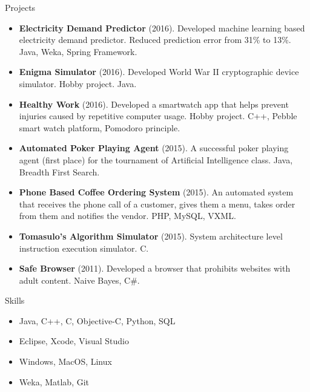 \documentclass[]{mcdowellcv}
\begin{document}
    \begin{cvsection}{Projects}
        \begin{cvsubsection}{}{}{}
            \begin{itemize}
            \item \textbf{Electricity Demand Predictor} (2016).  Developed machine learning based electricity demand predictor. Reduced prediction error from 31\% to 13\%. Java, Weka, Spring Framework.
            \item \textbf{Enigma Simulator} (2016).  Developed World War II cryptographic device simulator. Hobby project.  Java.
                \item \textbf{Healthy Work} (2016). Developed a smartwatch app that helps prevent injuries caused by repetitive computer usage. Hobby project. C++, Pebble smart watch platform, Pomodoro principle.                
                \item \textbf{Automated Poker Playing Agent} (2015). A successful poker playing agent (first place) for the tournament of Artificial Intelligence class. Java, Breadth First Search.
                \item \textbf{Phone Based Coffee Ordering System} (2015). An automated system that receives the phone call of a customer, gives them a menu, takes order from them and notifies the vendor.  PHP, MySQL, VXML.
                \item \textbf{Tomasulo’s Algorithm Simulator} (2015). System architecture level instruction execution simulator. C.
\item \textbf{Safe Browser} (2011). Developed a browser that prohibits websites with adult content. Naive Bayes, C\#.
            \end{itemize}
        \end{cvsubsection}
    \end{cvsection}
    
    
    \begin{cvsection}{Skills}
        \begin{cvsubsection}{}{}{}    
            \begin{itemize}
                \item Java, C++, C, Objective-C, Python, SQL
                \item Eclipse, Xcode, Visual Studio
                \item Windows, MacOS, Linux 
                \item Weka, Matlab, Git
            \end{itemize}
        \end{cvsubsection}
    \end{cvsection}
\end{document}
